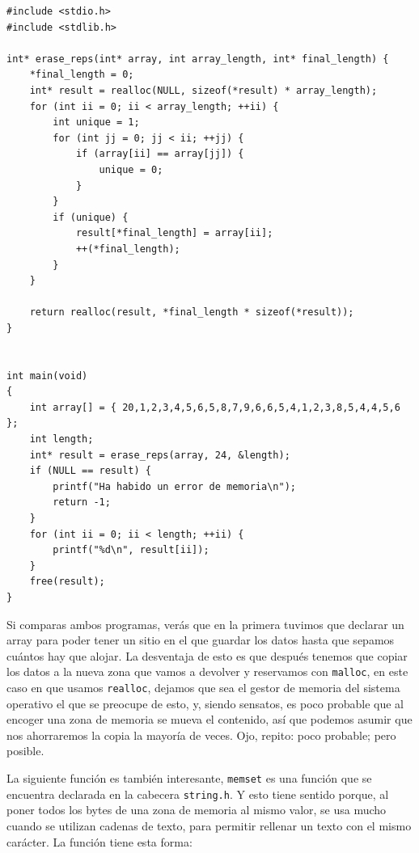 \documentclass[a4paper]{article}
\begin{document}
\noindent
\begin{minipage}[H]{\linewidth}
\mbox{}
\begin{lstlisting}[style=C, label={lst:reallocExample},
caption={Utilización de \texttt{realloc}}]
#include <stdio.h>
#include <stdlib.h>

int* erase_reps(int* array, int array_length, int* final_length) {
    *final_length = 0;
    int* result = realloc(NULL, sizeof(*result) * array_length);
    for (int ii = 0; ii < array_length; ++ii) {
        int unique = 1;
        for (int jj = 0; jj < ii; ++jj) {
            if (array[ii] == array[jj]) {
                unique = 0;
            }
        }
        if (unique) {
            result[*final_length] = array[ii];
            ++(*final_length);
        }
    }

    return realloc(result, *final_length * sizeof(*result));
}


int main(void)
{
    int array[] = { 20,1,2,3,4,5,6,5,8,7,9,6,6,5,4,1,2,3,8,5,4,4,5,6 };
    int length;
    int* result = erase_reps(array, 24, &length);
    if (NULL == result) {
        printf("Ha habido un error de memoria\n");
        return -1;
    }
    for (int ii = 0; ii < length; ++ii) {
        printf("%d\n", result[ii]);
    }
    free(result);
}
\end{lstlisting}
\end{minipage}

Si comparas ambos programas, verás que en la primera tuvimos que declarar un
array para poder tener un sitio en el que guardar los datos hasta que sepamos
cuántos hay que alojar. La desventaja de esto es que después tenemos que copiar
los datos a la nueva zona que vamos a devolver y reservamos con \verb!malloc!,
en este caso en que usamos \verb!realloc!, dejamos que sea el gestor de memoria
del sistema operativo el que se preocupe de esto, y, siendo sensatos, es poco
probable que al encoger una zona de memoria se mueva el contenido, así que
podemos asumir que nos ahorraremos la copia la mayoría de veces. Ojo, repito:
poco probable; pero posible.

La siguiente función es también interesante, \verb!memset! es una función que se
encuentra declarada en la cabecera \verb!string.h!. Y esto tiene sentido porque,
al poner todos los bytes de una zona de memoria al mismo valor, se usa mucho
cuando se utilizan cadenas de texto, para permitir rellenar un texto con el
mismo carácter. La función tiene esta forma:
\end{document}
